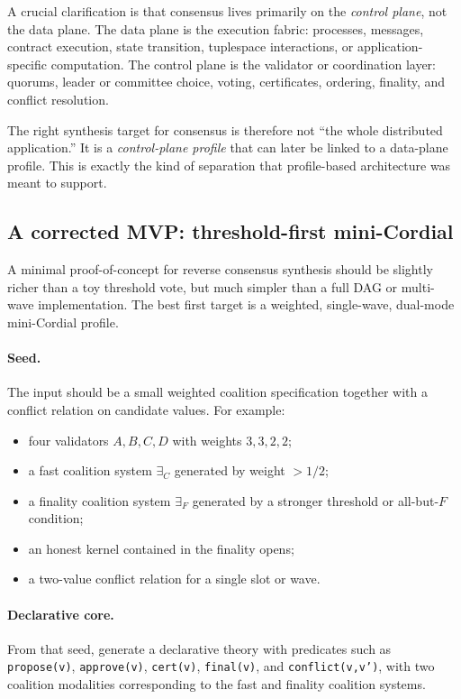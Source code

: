 \documentclass[11pt]{article}
\begin{document}
A crucial clarification is that consensus lives primarily on the \emph{control plane}, not the data plane. The data plane is the execution fabric: processes, messages, contract execution, state transition, tuplespace interactions, or application-specific computation. The control plane is the validator or coordination layer: quorums, leader or committee choice, voting, certificates, ordering, finality, and conflict resolution.

The right synthesis target for consensus is therefore not ``the whole distributed application.'' It is a \emph{control-plane profile} that can later be linked to a data-plane profile. This is exactly the kind of separation that profile-based architecture was meant to support.

\subsection{A corrected MVP: threshold-first mini-Cordial}

A minimal proof-of-concept for reverse consensus synthesis should be slightly richer than a toy threshold vote, but much simpler than a full DAG or multi-wave implementation. The best first target is a weighted, single-wave, dual-mode mini-Cordial profile.

\paragraph{Seed.}
The input should be a small weighted coalition specification together with a conflict relation on candidate values. For example:

\begin{itemize}
  \item four validators $A,B,C,D$ with weights $3,3,2,2$;
  \item a fast coalition system $\exists_C$ generated by weight $> 1/2$;
  \item a finality coalition system $\exists_F$ generated by a stronger threshold or all-but-$F$ condition;
  \item an honest kernel contained in the finality opens;
  \item a two-value conflict relation for a single slot or wave.
\end{itemize}

\paragraph{Declarative core.}
From that seed, generate a declarative theory with predicates such as
\texttt{propose(v)}, \texttt{approve(v)}, \texttt{cert(v)}, \texttt{final(v)}, and \texttt{conflict(v,v')},
with two coalition modalities corresponding to the fast and finality coalition systems.
\end{document}
